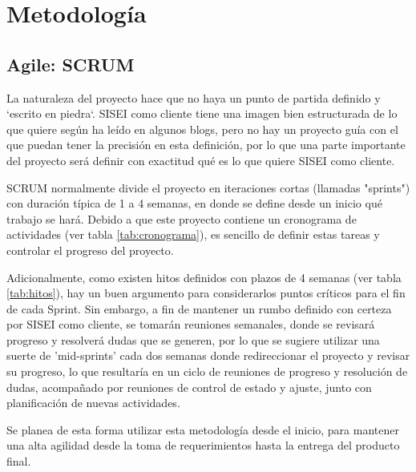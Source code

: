 
\section{Metodología}
  \subsection{Agile: SCRUM}
    La naturaleza del proyecto hace que no haya un punto de partida definido y `escrito en piedra`. SISEI como cliente tiene una imagen bien estructurada de lo que quiere según ha leído en algunos blogs, pero no hay un proyecto guía con el que puedan tener la precisión en esta definición, por lo que una parte importante del proyecto será definir con exactitud qué es lo que quiere SISEI como cliente.

    SCRUM normalmente divide el proyecto en iteraciones cortas (llamadas "sprints") con duración típica de 1 a 4 semanas, en donde se define desde un inicio qué trabajo se hará. Debido a que este proyecto contiene un cronograma de actividades (ver tabla \ref{tab:cronograma}), es sencillo de definir estas tareas y controlar el progreso del proyecto.

    Adicionalmente, como existen hitos definidos con plazos de 4 semanas (ver tabla \ref{tab:hitos}), hay un buen argumento para considerarlos puntos críticos para el fin de cada Sprint. Sin embargo, a fin de mantener un rumbo definido con certeza por SISEI como cliente, se tomarán reuniones semanales, donde se revisará progreso y resolverá dudas que se generen, por lo que se sugiere utilizar una suerte de 'mid-sprints' cada dos semanas donde redireccionar el proyecto y revisar su progreso, lo que resultaría en un ciclo de reuniones de progreso y resolución de dudas, acompañado por reuniones de control de estado y ajuste, junto con planificación de nuevas actividades.

    Se planea de esta forma utilizar esta metodología desde el inicio, para mantener una alta agilidad desde la toma de requerimientos hasta la entrega del producto final.

\clearpage
